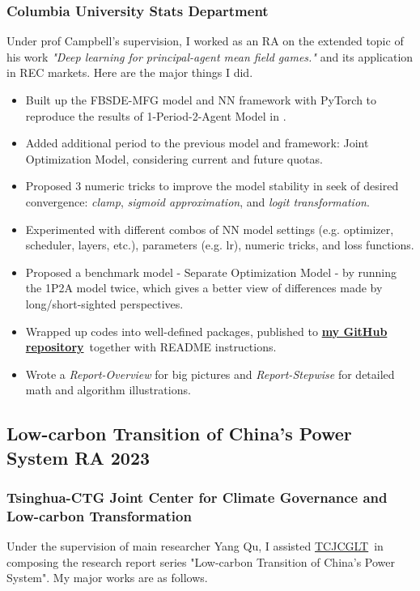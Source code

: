\documentclass[a4paper]{article}
\newcommand{\TCJCGLT}{\href{https://www.jcglt.tsinghua.edu.cn/en/about/introduction.html}{TCJCGLT}}
\newcommand{\MFG}{\href{https://github.com/OrangeAoo/Multi-Period-Compliance-MFG-FBSDEs}{\textbf{my GitHub repository}}}
\begin{document}
\subsubsection{Columbia University Stats Department}
\vspace{3pt}
\begin{adjustwidth}{10pt}{}
    Under prof Campbell's supervision, I worked as an RA on the extended topic of his work \textit{"Deep learning for principal-agent mean field
games."} \cite{SC} and its application in REC markets. Here are the major things I did.
\end{adjustwidth}

\begin{itemize}
    \item Built up the FBSDE-MFG model and NN framework with PyTorch to reproduce the results of 1-Period-2-Agent Model in \cite{SC}.
    \item Added additional period to the previous model and framework: Joint Optimization Model, considering current and future quotas. 
    \item Proposed 3 numeric tricks to improve the model stability in seek of desired convergence: \textit{clamp}, \textit{sigmoid approximation}, and \textit{logit transformation}.
    \item Experimented with different combos of NN model settings (e.g. optimizer, scheduler, layers, etc.), parameters (e.g. lr), numeric tricks, and loss functions.
    \item Proposed a benchmark model - Separate Optimization Model - by running the 1P2A model twice, which gives a better view of differences made by long/short-sighted perspectives. 
    \item Wrapped up codes into well-defined packages, published to \MFG\ together with README instructions. 
    \item Wrote a \textit{Report-Overview} for big pictures and \textit{Report-Stepwise} for detailed math and algorithm illustrations. 
\end{itemize}

\newpage
\subsection{Low-carbon Transition of China's Power System \normalfont \hfill RA \hfill 2023} 
\subsubsection{Tsinghua-CTG Joint Center for Climate Governance and Low-carbon Transformation} 
\vspace{3pt}
\begin{adjustwidth}{10pt}{}
    Under the supervision of main researcher Yang Qu, I assisted \TCJCGLT\ in composing the research report series "Low-carbon Transition of China's Power System". My major works are as follows.
\end{adjustwidth}
\end{document}
